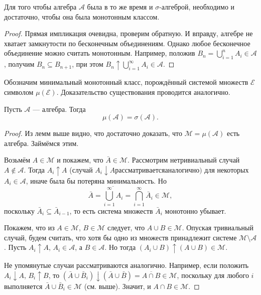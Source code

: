 \begin{lemma}\label{the:monoton}
  Для того чтобы алгебра $ \mathscr A $ была в то же время и $ \sigma
  $-алгеброй, необходимо и достаточно, чтобы она была монотонным классом.
\end{lemma}
\begin{proof}
  Прямая импликация очевидна, проверим обратную. И вправду, алгебре не хватает замкнутости по бесконечным объединениям. Однако
  любое бесконечное объединение можно считать монотонным. Например, положив $
B_n = \bigcup\limits_{i=1}^n A_i \in \mathscr A $, получим $ B_n \subseteq B_{n+1} $,
при этом $ B_n \uparrow \bigcup\limits_{i=1}^\infty A_i \in \mathscr A $.
\end{proof}
Обозначим минимальный монотонный класс, порождённый системой множеств $ \mathscr
E$ символом $ \mu(\mathscr E) $. Доказательство существования проводится
аналогично.

\begin{theorem}
  Пусть $ \mathscr A $ --- алгебра. Тогда 
  \[
      \mu(\mathscr A) = \sigma(\mathscr A).
  \]
\end{theorem}
\begin{proof}
  Из лемм выше видно, что достаточно доказать, что $\mathscr M = \mu(\mathscr A) $ есть
  алгебра. Займёмся этим.

  Возьмём $ A \in \mathscr M $ и покажем, что $ \bar A \in \mathscr M $.
  Рассмотрим нетривиальный случай $ A \notin \mathscr A $. Тогда $ A_i \uparrow
  A$ (случай $ A_i \downarrow A рассматривается аналогично) $ для некоторых $ A_i \in \mathscr A $, иначе была
  бы потеряна минимальность. Но 
  \[
    \bar A =\overline{\bigcup_{i=1}^\infty A_i} = \bigcap_{i=1}^\infty \bar A_i
    \in \mathscr M,
  \]
  поскольку $ \bar A_i \subseteq \bar A_{i-1} $, то есть система множеств $ \bar
  A_i$ монотонно убывает.

  Покажем, что из $ A \in \mathscr M $, $ B \in \mathscr M $ следует, что $ A
  \cup B \in \mathscr M $. Опуская тривиальный случай, будем считать, что хотя
  бы одно из множеств принадлежит системе $ \mathscr M \setminus \mathscr A $.
  Пусть $ A_i \uparrow A $, $ A_i \in \mathscr A $, а $ B \in \mathscr A $. Но
  тогда $ (A_i\cup B) \uparrow (A\cup B) \in \mathscr M $. 

  Не упомянутые случаи
  рассматриваются аналогично. Например, если положить $ A_i \downarrow A $, $
  B_i \uparrow B $, то $ (\bar A \cup \bar B_i) \downarrow (\bar A
  \cup \bar B) = \overline{A \cap B} \in \mathscr M $, поскольку для любого $ i
  $ выполняется $ \bar A \cup \bar B_i \in \mathscr M $ (см. выше). Значит, и $ A \cap B \in
  \mathscr M$.
\end{proof}

